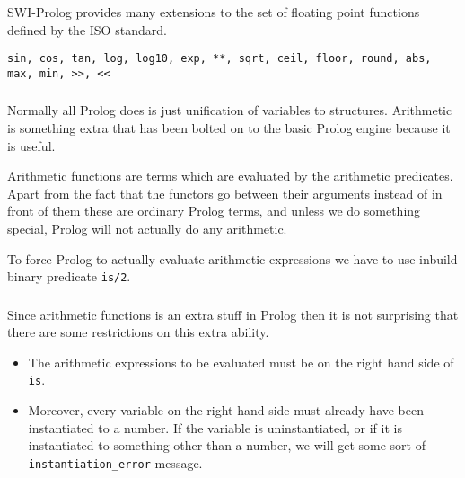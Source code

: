 \begin{frame}
	\frametitle{\insertsection}
	
	SWI-Prolog provides many extensions to the set of floating point functions defined by the ISO standard.
	
	\begin{example}
		\texttt{sin, cos, tan, log, log10, exp, **, sqrt, ceil, floor, round, abs, max, min, >>, <<}
	\end{example}
\end{frame}


\begin{frame}
	\frametitle{\insertsection}
	
	Normally all Prolog does is just unification of variables to structures. Arithmetic is something extra that has been bolted on to the basic Prolog engine because it is useful.
	
	Arithmetic functions are terms which are evaluated by the arithmetic predicates. Apart from the fact that the functors go between their	arguments instead of in front of them these are ordinary Prolog terms, and unless we	do something special, Prolog will not actually do any arithmetic.
	
	To force Prolog to actually evaluate arithmetic	expressions we have to use inbuild binary predicate \texttt{is/2}.
	
\end{frame}


\begin{frame}
	\frametitle{\insertsection}
	
	Since arithmetic functions is an extra stuff in Prolog then it is not surprising that there are some restrictions on this extra ability.
	
	\begin{itemize}
		\item The arithmetic expressions to be evaluated must be on the right hand side of \texttt{is}.
		\item Moreover, every variable on the right hand side must already have been instantiated to a number. If the variable is uninstantiated, or if it is instantiated to something
		other than a number, we will get some sort of \texttt{instantiation\_error} message.
	\end{itemize}

\end{frame}


